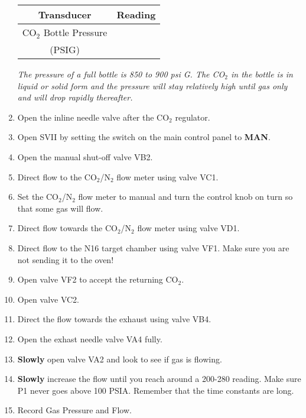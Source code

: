 \begin{enumerate}
\begin{center}
\begin{tabular}{|c|c|}
\hline
Transducer & Reading \\
\hline
CO$_{2}$ Bottle Pressure & \\
(PSIG) & \\
\hline
\end{tabular}
\end{center}
{\it The pressure of a full bottle is 850 to 900 psi G. The CO$_{2}$
in the bottle is in liquid or solid form and the pressure will stay
relatively high until gas only and will drop rapidly thereafter.}%
\item \CheckBox[name=gbsp13]{} Open the inline needle valve after the CO$_2$ regulator.
\item \CheckBox[name=gbsp14]{} Open SVII by setting the switch on the main control panel to {\bf MAN}.
\item \CheckBox[name=gbsp15]{} Open the manual shut-off valve VB2.
\item \CheckBox[name=gbsp16]{} Direct flow to the CO$_2$/N$_2$ flow meter using valve VC1.
\item \CheckBox[name=gbsp17]{} Set the CO$_2$/N$_2$ flow meter to manual and turn the control knob on turn so that some gas will flow.
\item \CheckBox[name=gbsp18]{} Direct flow towards the CO$_2$/N$_2$ flow meter using valve VD1.
\item \CheckBox[name=gbsp19]{} Direct flow to the N16 target chamber using valve VF1. Make sure you are not sending it to the oven!
\item \CheckBox[name=gbsp20]{} Open valve VF2 to accept the returning CO$_2$.
\item \CheckBox[name=gbsp21]{} Open valve VC2.
\item \CheckBox[name=gbsp22]{} Direct the flow towards the exhaust using valve VB4.
\item \CheckBox[name=gbsp23]{} Open the exhast needle valve VA4 fully.
\item \CheckBox[name=gbsp24]{} {\bf Slowly} open valve VA2 and look to see if gas is flowing.
\item \CheckBox[name=gbsp25]{} {\bf Slowly} increase the flow until you reach around a 200-280 reading. Make sure P1 never goes above 100 PSIA. Remember that the time constants are long.
\item \CheckBox[name=gbsp26]{} Record Gas Pressure and Flow.

\end{enumerate}
